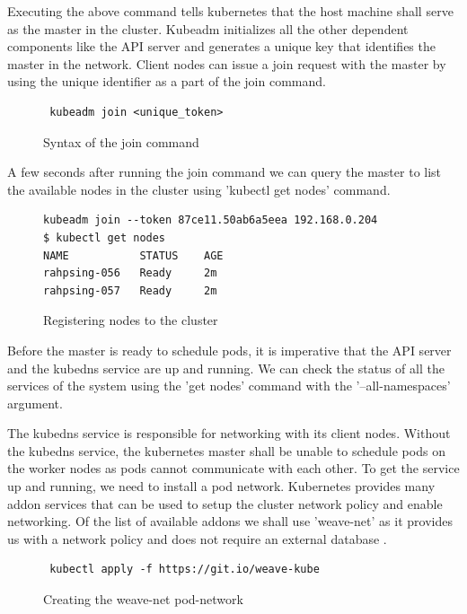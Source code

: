 \documentclass[9pt,twocolumn,twoside]{../../styles/osajnl}
\begin{document}
\noindent
Executing the above command tells kubernetes that the host machine
shall serve as the master in the cluster. Kubeadm initializes all the
other dependent components like the API server and generates a unique
key that identifies the master in the network. Client nodes can issue
a join request with the master by using the unique identifier as a
part of the join command.

\begin{figure}[H]
\begin{verbatim}
 kubeadm join <unique_token>
\end{verbatim}
\caption{Syntax of the join command}
\label{Syntax of the join command}
\end{figure}

\noindent
A few seconds after running the join command we can query the master
to list the available nodes in the cluster using 'kubectl get nodes' command.

\begin{figure}[H]
\begin{verbatim}
kubeadm join --token 87ce11.50ab6a5eea 192.168.0.204
$ kubectl get nodes
NAME           STATUS    AGE
rahpsing-056   Ready     2m
rahpsing-057   Ready     2m
\end{verbatim}
\caption{Registering nodes to the cluster}
\label{Registering nodes to the cluster}
\end{figure}

\noindent
Before the master is ready to schedule pods, it is imperative that the
API server and the kubedns service are up and running. We can check
the status of all the services of the system using the
'get nodes' command with the '--all-namespaces' argument.

\noindent
The kubedns service is responsible for networking with its client
nodes. Without the kubedns service, the kubernetes master shall be
unable to schedule pods on the worker nodes as pods cannot communicate
with each other. To get the service up and running, we need to install
a pod network. Kubernetes provides many addon services that can be
used to setup the cluster network policy and enable networking. Of the
list of available addons we shall use 'weave-net' as it provides us
with a network policy and does not require an external database
\cite{www-kubernetes-addons}.

\begin{figure}[H]
\begin{verbatim}
 kubectl apply -f https://git.io/weave-kube
\end{verbatim}
\caption{Creating the weave-net pod-network}
\label{Creating the weave-net pod-network}
\end{figure}
\end{document}
